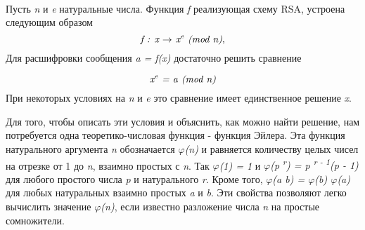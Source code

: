 \paragraph{} Пусть \textit{n} и \textit{e} натуральные числа. Функция \textit{f} реализующая схему RSA, устроена следующим образом
\begin{equation}
  \textit{f : x {$\rightarrow$} x\textsuperscript{e} (mod n)},
\end{equation}
Для расшифровки сообщения \textit{a = f(x)} достаточно решить сравнение 

\begin{equation}
  \textit{x\textsuperscript{e} = a (mod n)} 
\end{equation}
При некоторых условиях на \textit{n} и \textit{e} это сравнение имеет единственное решение \textit{x}.

  Для того, чтобы описать эти условия и объяснить, как можно найти решение, нам потребуется одна теоретико-числовая функция - функция Эйлера. 
Эта функция натурального аргумента \textit{n} обозначается \textit{{$\varphi$}(n)} и равняется количеству целых чисел на отрезке от 1 до \textit{n}, 
взаимно простых с \textit{n}. Так \textit{{$\varphi$}(1) = 1} и \textit{{$\varphi$}(p\textsuperscript{ r}) = p\textsuperscript{ r - 1}(p - 1)} 
для любого простого числа \textit{p} и натурального \textit{r}. Кроме того, \textit{{$\varphi$}(a b) = {$\varphi$}(b) {$\varphi$}(a)} 
для любых натуральных взаимно простых \textit{a} и \textit{b}. Эти свойства позволяют легко вычислить значение \textit{{$\varphi$}(n)}, если известно 
разложение числа \textit{n} на простые сомножители. 


